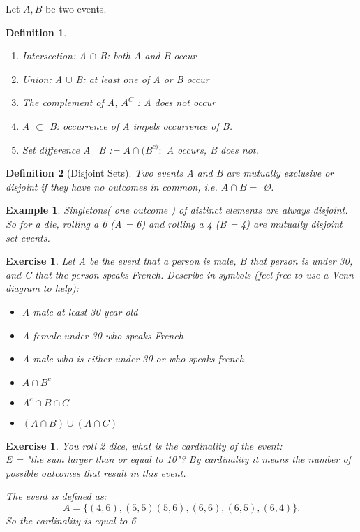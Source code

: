 \documentclass[a4paper]{article}
\newcounter{counter}
\numberwithin{counter}{subsection}
\theoremstyle{break}
\newtheorem{definition}{Definition}
\newtheorem{exmp}[counter]{Example}
\newtheorem{exe}[counter]{Exercise}
\begin{document}
Let $A, B$ be two events.
\begin{definition}
	\begin{enumerate}
		\item Intersection: A $\cap$ B: both A and B occur
		\item Union: A $\cup $ B: at least one of A or B occur
		\item The complement of A, $A^{C}$ : A does not occur
		\item A $\subset $ B: occurrence of A impels occurrence of B.
		\item Set difference A \ B := $A \cap (B^{c)}:$ A occurs, B does not.
	\end{enumerate}
\end{definition}

\begin{definition}[Disjoint Sets]
	Two events A and B are mutually exclusive or disjoint if they have no outcomes in common, i.e. $A\cap B = $ \O.
\end{definition}

\begin{exmp}
	Singletons( one outcome )  of distinct elements are always disjoint. So for a die, rolling a 6 (A = {6}) and rolling a 4 (B = {4}) are mutually disjoint set events. 
\end{exmp}

\begin{exe}
	Let A be the event that a person is male, B that person is under 30, and C that the person speaks French. Describe in symbols (feel free to use a Venn diagram to help):
	\begin{itemize}
		\item A male at least 30 year old
			\item A female under 30 who speaks French
				\item A male who is either under 30 or who speaks french 
	\end{itemize}

	\begin{sol}
		\begin{itemize}
			\item $A \cap B^{c}$
			\item $A^{c} \cap B \cap C$
			\item $(A \cap B) \cup (A \cap C)$
		\end{itemize}	
	\end{sol}
\end{exe}

\begin{exe}
	You roll 2 dice, what is the cardinality of the event:\\
	E = "the sum larger than or equal to 10"? By cardinality it means the number of possible outcomes that result in this event.
	\begin{sol}
		The event is defined as: \[
			A = \{(4,6), (5,5)(5,6), (6,6),(6,5),(6,4)\} 
		.\] 
		So the cardinality is equal to 6
	\end{sol}
\end{exe}
\end{document}
